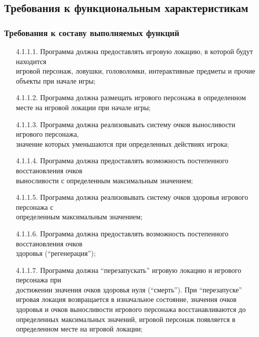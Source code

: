 \subsection{Требования к функциональным характеристикам}

\subsubsection{Требования к составу выполняемых функций}

\begin{enumerate}
    \item[4.1.1.1.] Программа должна предоставлять игровую локацию, в которой будут находится\\
    игровой персонаж, ловушки, головоломки, интерактивные предметы и прочие объекты при начале игры;
    \item[4.1.1.2.] Программа должна размещать игрового персонажа в определенном месте на игровой локации при начале игры;
    \item[4.1.1.3.] Программа должна реализовывать систему очков выносливости игрового персонажа,\\
    значение которых уменьшаются при определенных действиях игрока;
    \item[4.1.1.4.] Программа должна предоставлять возможность постепенного восстановления очков\\
    выносливости с определенным максимальным значением;
    \item[4.1.1.5.] Программа должна реализовывать систему очков здоровья игрового персонажа с\\
    определенным максимальным значением;
    \item[4.1.1.6.] Программа должна предоставлять возможность постепенного восстановления очков\\
    здоровья (``регенерация'');
    \item[4.1.1.7.] Программа должна ``перезапускать'' игровую локацию и игрового персонажа при\\
    достижении значения очков здоровья нуля (``смерть''). При ``перезапуске'' игровая локация возвращается в изначальное состояние, значения очков здоровья и очков выносливости игрового персонажа восстанавливаются до определенных максимальных значений, игровой персонаж появляется в определенном месте на игровой локации;

\end{enumerate}

